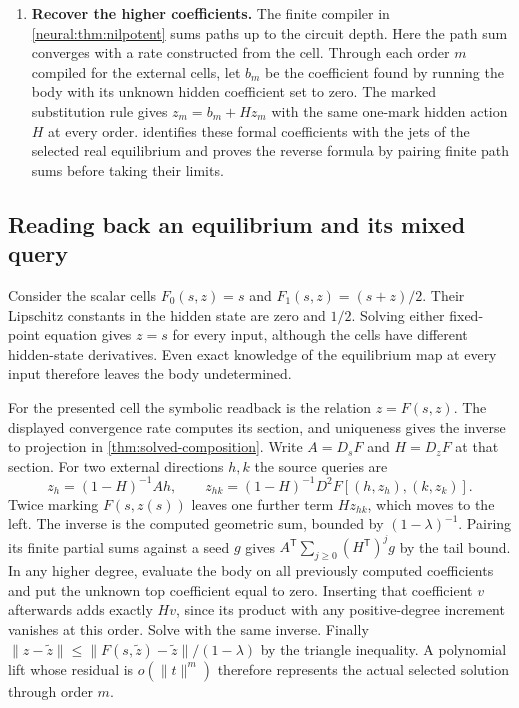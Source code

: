 \documentclass[11pt,a4paper]{article}
\theoremstyle{definition}
\theoremstyle{remark}\newaliascnt{remark}{theorem}
\numberwithin{equation}{section}
\begin{document}
\begin{enumerate}[titledsteps]
    \item \textbf{Recover the higher coefficients.} The finite compiler in \cref{neural:thm:nilpotent} sums paths up to the circuit depth. Here the path sum converges with a rate constructed from the cell. Through each order $m$ compiled for the external cells, let $b_m$ be the coefficient found by running the body with its unknown hidden coefficient set to zero. The marked substitution rule gives $z_m=b_m+Hz_m$ with the same one-mark hidden action $H$ at every order.  identifies these formal coefficients with the jets of the selected real equilibrium and proves the reverse formula by pairing finite path sums before taking their limits.
\end{enumerate}

\subsection{Reading back an equilibrium and its mixed query}
Consider the scalar cells $F_0(s,z)=s$ and $F_1(s,z)=(s+z)/2$. Their Lipschitz constants in the hidden state are zero and $1/2$. Solving either fixed-point equation gives $z=s$ for every input, although the cells have different hidden-state derivatives. Even exact knowledge of the equilibrium map at every input therefore leaves the body undetermined.

For the presented cell the symbolic readback is the relation $z=F(s,z)$. The displayed convergence rate computes its section, and uniqueness gives the inverse to projection in \cref{thm:solved-composition}. Write $A=D_sF$ and $H=D_zF$ at that section. For two external directions $h,k$ the source queries are
\[
 z_h=(1-H)^{-1}Ah,\qquad
 z_{hk}=(1-H)^{-1}D^2F[(h,z_h),(k,z_k)] .
\]
Twice marking $F(s,z(s))$ leaves one further term $Hz_{hk}$, which moves to the left. The inverse is the computed geometric sum, bounded by $(1-\lambda)^{-1}$. Pairing its finite partial sums against a seed $g$ gives $A^{\mathsf{T}}\sum_{j\ge0}(H^{\mathsf{T}})^jg$ by the tail bound. In any higher degree, evaluate the body on all previously computed coefficients and put the unknown top coefficient equal to zero. Inserting that coefficient $v$ afterwards adds exactly $Hv$, since its product with any positive-degree increment vanishes at this order. Solve with the same inverse. Finally $\|z-\tilde z\|\le\|F(s,\tilde z)-\tilde z\|/(1-\lambda)$ by the triangle inequality. A polynomial lift whose residual is $o(\|t\|^m)$ therefore represents the actual selected solution through order $m$.
\end{document}
